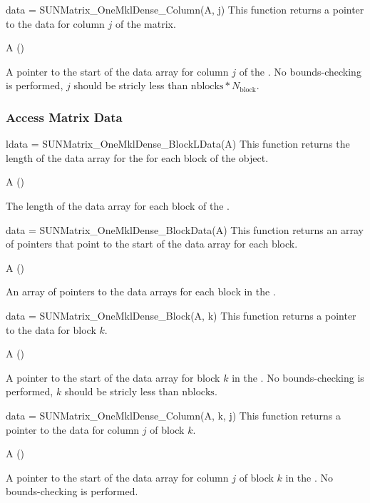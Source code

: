 {
  data = SUNMatrix\_OneMklDense\_Column(A, j)
}
{
  This function returns a pointer to the data for column $j$ of the matrix.
}
{
  \begin{args}
  \item[A] ()
  \end{args}
}
{
  A pointer to the start of the data array for column $j$ of the .
}
{
  No bounds-checking is performed, $j$ should be stricly less than
  $\text{nblocks} * N_{\text{block}}$.
}


\subsubsection*{Access Matrix Data}


{
  ldata = SUNMatrix\_OneMklDense\_BlockLData(A)
}
{
  This function returns the length of the data array for the  for
  each block of the  object.
}
{
  \begin{args}
  \item[A] ()
  \end{args}
}
{
  The length of the data array for each block of the .
}
{}


{
  data = SUNMatrix\_OneMklDense\_BlockData(A)
}
{
  This function returns an array of pointers that point to
  the start of the data array for each block.
}
{
  \begin{args}
  \item[A] ()
  \end{args}
}
{
  An array of pointers to the data arrays for each block in the .
}
{}

{
  data = SUNMatrix\_OneMklDense\_Block(A, k)
}
{
  This function returns a pointer to the data for block $k$.
}
{
  \begin{args}
  \item[A] ()
  \end{args}
}
{
  A pointer to the start of the data array for block $k$ in the .
}
{
  No bounds-checking is performed, $k$ should be stricly less than
  $\text{nblocks}$.
}


{
  data = SUNMatrix\_OneMklDense\_Column(A, k, j)
}
{
  This function returns a pointer to the data for column $j$ of block $k$.
}
{
  \begin{args}
  \item[A] ()
  \end{args}
}
{
  A pointer to the start of the data array for column $j$ of block $k$ in the
  .
}
{
  No bounds-checking is performed.
}


